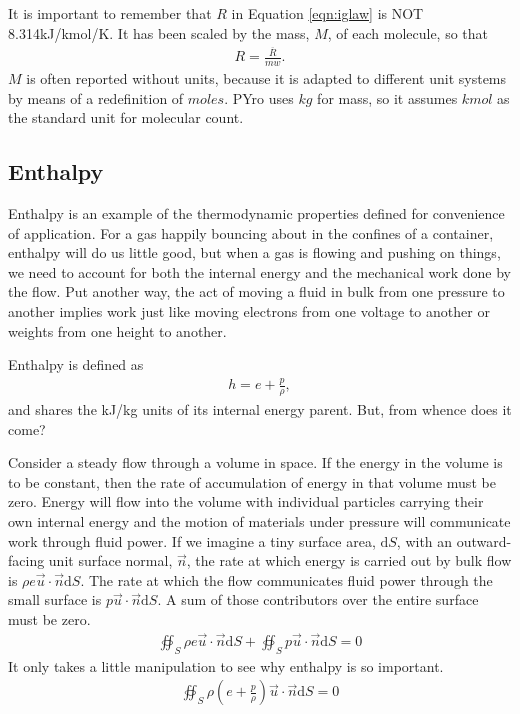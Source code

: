 It is important to remember that $R$ in Equation \ref{eqn:iglaw} is NOT 8.314kJ/kmol/K.  It has been scaled by the mass, $M$, of each molecule, so that
\begin{align}
R = \frac{\overline{R}}{mw}.
\end{align}
$M$ is often reported without units, because it is adapted to different unit systems by means of a redefinition of $moles$.  PYro uses $kg$ for mass, so it assumes $kmol$ as the standard unit for molecular count.

\subsection{Enthalpy}
Enthalpy is an example of the thermodynamic properties defined for convenience of application.  For a gas happily bouncing about in the confines of a container, enthalpy will do us little good, but when a gas is flowing and pushing on things, we need to account for both the internal energy and the mechanical work done by the flow.  Put another way, the act of moving a fluid in bulk from one pressure to another implies work just like moving electrons from one voltage to another or weights from one height to another.

Enthalpy is defined as
\begin{align}
h = e + \frac{p}{\rho},
\end{align}
and shares the kJ/kg units of its internal energy parent.  But, from whence does it come?

Consider a steady flow through a volume in space.  If the energy in the volume is to be constant, then the rate of accumulation of energy in that volume must be zero.  Energy will flow into the volume with individual particles carrying their own internal energy and the motion of materials under pressure will communicate work through fluid power.  If we imagine a tiny surface area, $\mathrm{d}S$, with an outward-facing unit surface normal, $\vec{n}$, the rate at which energy is carried out by bulk flow is $\rho e \vec{u} \cdot \vec{n} \mathrm{d}S$.  The rate at which the flow communicates fluid power through the small surface is $p \vec{u}\cdot\vec{n} \mathrm{d}S$.  A sum of those contributors over the entire surface must be zero.
\begin{align}
\oiint_S \rho e \vec{u}\cdot \vec{n} \mathrm{d}S + \oiint_S p \vec{u}\cdot \vec{n} \mathrm{d}S = 0
\end{align}
It only takes a little manipulation to see why enthalpy is so important.
\begin{align}
\oiint_S \rho \left(e + \frac{p}{\rho}\right) \vec{u}\cdot \vec{n} \mathrm{d}S = 0
\end{align}

